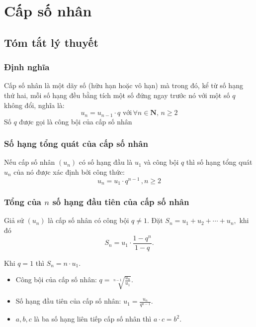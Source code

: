 \def\tenchude{CẤP SỐ NHÂN}
\setcounter{section}{6}
\setcounter{dang}{0}
\setcounter{ex}{0}
\setcounter{bt}{0}
\setcounter{vd}{0}
\section{Cấp số nhân}
\subsection{Tóm tắt lý thuyết}
\begin{tomtat}
	\subsubsection{Định nghĩa} 
	Cấp số nhân là một dãy số (hữu hạn hoặc vô hạn) mà trong đó, kể từ số hạng thứ hai, mỗi số hạng đều bằng tích một số đứng ngay trước nó với một số $ q $ không đổi, nghĩa là:
	$$ u_{n}=u_{n-1}\cdot q\,\,\text{với}\,\forall n\in \mathbf{N}{,}\,n\ge 2 $$
	Số $ q $ được gọi là công bội của cấp số nhân
	\subsubsection{Số hạng tổng quát của cấp số nhân}
	Nếu cấp số nhân $ (u_n) $ có số hạng đầu là $ u_1 $ và công bội $ q $ thì số hạng tổng quát $ u_n $ của nó được xác định bởi công thức:
	$$u_n = u_1 \cdot q^{n-1}\,,n\ge 2$$
	\subsubsection{Tổng của $ n $ số hạng đầu tiên của cấp số nhân}
	Giả sử $ (u_n) $ là cấp số nhân có công bội $ q\ne 1 $. Đặt $ S_n=u_1+u_2+\cdots +u_n, $ khi đó
	$$S_n = u_1\cdot\frac{1-q^n}{1-q}.$$
	\begin{note}
		Khi $ q=1 $ thì $ S_n=n\cdot u_1 $.
	\end{note}	
	\begin{itemize}
		\item Công bội của cấp số nhân: $q = \sqrt[n-1]{\frac{u_n}{u_1}}$.
		\item Số hạng đầu tiên của cấp số nhân: $u_1 = \frac{u_n}{q^{n-1}}$.
		\item $ a,b,c $ là ba số hạng liên tiếp cấp số nhân thì $ a\cdot c=b^2 $. 
	\end{itemize}	
\end{tomtat}

